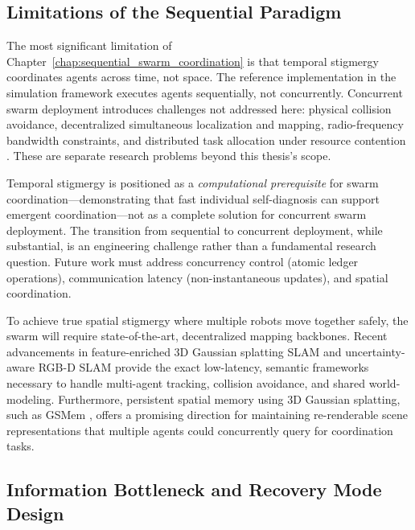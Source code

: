 \documentclass[12pt,a4paper,oneside]{report}
\begin{document}
\subsection{Limitations of the Sequential Paradigm}
\label{subsec:limitations_of_the_sequential_paradigm}

The most significant limitation of Chapter~\ref{chap:sequential_swarm_coordination} is that temporal stigmergy coordinates agents across time, not space. The reference implementation in the simulation framework executes agents sequentially, not concurrently. Concurrent swarm deployment introduces challenges not addressed here: physical collision avoidance, decentralized simultaneous localization and mapping, radio-frequency bandwidth constraints, and distributed task allocation under resource contention \cite{matsuki2024gaussian, keetha2024splattam}. These are separate research problems beyond this thesis's scope.

Temporal stigmergy is positioned as a \textit{computational prerequisite} for swarm coordination—demonstrating that fast individual self-diagnosis can support emergent coordination—not as a complete solution for concurrent swarm deployment. The transition from sequential to concurrent deployment, while substantial, is an engineering challenge rather than a fundamental research question. Future work must address concurrency control (atomic ledger operations), communication latency (non-instantaneous updates), and spatial coordination. 

To achieve true spatial stigmergy where multiple robots move together safely, the swarm will require state-of-the-art, decentralized mapping backbones. Recent advancements in feature-enriched 3D Gaussian splatting SLAM \cite{thirgood2025featureslam} and uncertainty-aware RGB-D SLAM \cite{tran2025varsplat} provide the exact low-latency, semantic frameworks necessary to handle multi-agent tracking, collision avoidance, and shared world-modeling. Furthermore, persistent spatial memory using 3D Gaussian splatting, such as GSMem \cite{lu2025gsmem}, offers a promising direction for maintaining re-renderable scene representations that multiple agents could concurrently query for coordination tasks.

\subsection{Information Bottleneck and Recovery Mode Design}
\label{subsec:information_bottleneck_and_recovery_mode_design}
\end{document}
